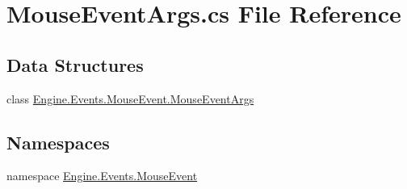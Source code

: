 \hypertarget{a00062}{}\section{Mouse\+Event\+Args.\+cs File Reference}
\label{a00062}
\subsection*{Data Structures}
\begin{DoxyCompactItemize}
\item 
class \hyperlink{a00374}{Engine.\+Events.\+Mouse\+Event.\+Mouse\+Event\+Args}
\end{DoxyCompactItemize}
\subsection*{Namespaces}
\begin{DoxyCompactItemize}
\item 
namespace \hyperlink{a00248}{Engine.\+Events.\+Mouse\+Event}
\end{DoxyCompactItemize}
